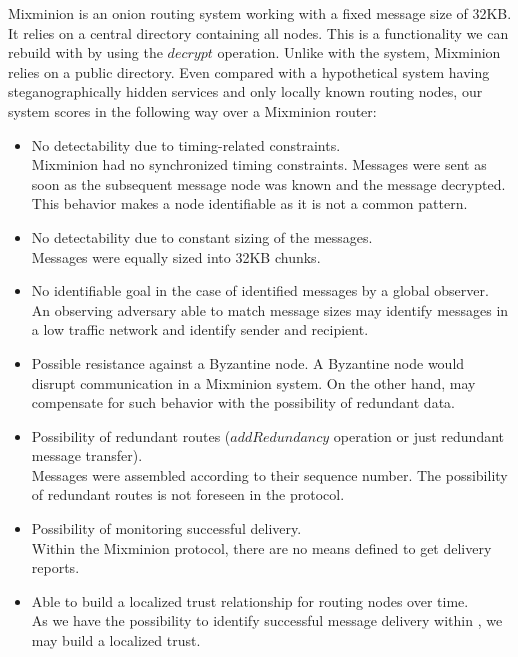 Mixminion is an onion routing system working with a fixed message size of 32KB. It relies on a central directory containing all nodes. This is a functionality we can rebuild with \MessageVortex{} by using the $decrypt$ operation. Unlike with the \MessageVortex{} system, Mixminion relies on a public directory. Even compared with a hypothetical system having steganographically hidden services and only locally known routing nodes, our system scores in the following way over a Mixminion router:

\begin{itemize}
	\item No detectability due to timing-related constraints.\\
	Mixminion had no synchronized timing constraints. Messages were sent as soon as the subsequent message node was known and the message decrypted. This behavior makes a node identifiable as it is not a common pattern.
	\item No detectability due to constant sizing of the messages.\\
	Messages were equally sized into 32KB chunks.
	\item No identifiable goal in the case of identified messages by a global observer.\\
	An observing adversary able to match message sizes may identify messages in a low traffic network and identify sender and recipient. 
	\item Possible resistance against a Byzantine node.
	A Byzantine node would disrupt communication in a Mixminion system. On the other hand, \MessageVortex{} may compensate for such behavior with the possibility of redundant data.
	\item Possibility of redundant routes ($addRedundancy$ operation or just redundant message transfer).\\
	Messages were assembled according to their sequence number. The possibility of redundant routes is not foreseen in the protocol.
	\item Possibility of monitoring successful delivery.\\
	Within the Mixminion protocol, there are no means defined to get delivery reports.
	\item Able to build a localized trust relationship for routing nodes over time.\\
	As we have the possibility to identify successful message delivery within \MessageVortex{}, we may build a localized trust.
\end{itemize}

